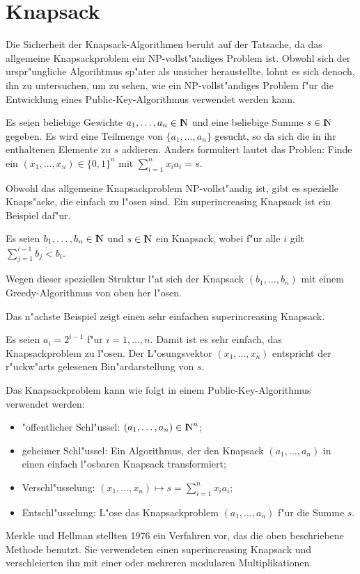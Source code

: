   \section{Knapsack}
     Die Sicherheit der Knapsack-Algorithmen beruht auf der Tatsache, 
     da\3 das allgemeine Knapsackproblem ein NP-vollst"andiges Problem ist. 
     Obwohl sich der urspr"ungliche Algorihtmus sp"ater als unsicher 
     heraustellte, lohnt es sich denoch, ihn zu untersuchen, um zu sehen, 
     wie ein NP-vollst"andiges Problem f"ur die Entwicklung eines 
     Public-Key-Algorithmus verwendet werden kann.
     \begin{definition} Es seien beliebige Gewichte 
       $a_1, \ldots ,a_n\in \N$ und eine beliebige Summe $s \in \N$ gegeben. 
       Es wird eine Teilmenge von $\{ a_1, \ldots ,a_n \}$ gesucht, so da\3 
       sich die in ihr enthaltenen Elemente zu $s$ addieren. Anders formuliert 
       lautet das Problen: Finde ein 
       $(x_1,\ldots ,x_n) \in \{0,1\}^n$ mit $\sum_{i=1}^{n}x_i a_i = s$.
     \end{definition}
     Obwohl das allgemeine Knapsackproblem NP-vollst"andig ist, gibt es 
     spezielle Knaps"acke, die einfach zu l"osen sind. Ein superincreasing 
     Knapsack ist ein Beispiel daf"ur.
     \begin{definition}
        Es seien $b_1,\ldots, b_n\in \N$ und $s\in \N$ ein Knapsack, 
        wobei f"ur alle $i$ gilt $\sum_{j=1}^{i-1}b_j < b_i$.
     \end{definition}
     Wegen dieser speziellen Struktur l"a\3t sich der Knapsack 
     $(b_1,\ldots ,b_n)$ mit einem Greedy-Algorithmus von oben her l"osen.

     Das n"achste Beispiel zeigt einen sehr einfachen superincreasing Knapsack.
     \begin{beispiel}
        Es seien $a_i = 2^{i-1}$ f"ur $i=1,\ldots , n$. Damit ist es sehr einfach,
        das Knapsackproblem zu l"osen. Der L"osungsvektor $(x_1,\ldots ,x_n)$ 
        entspricht der r"uckw"arts gelesenen Bin"ardarstellung von $s$.
     \end{beispiel}
     Das Knapsackproblem kann wie folgt in einem Public-Key-Algorithmus verwendet werden:
     \begin{itemize}
       \item "offentlicher Schl"ussel: $(a_1,\ldots,a_n) \in \N^n$;
       \item geheimer Schl"ussel: Ein Algorithmus, der den Knapsack 
             $(a_1,\ldots,a_n)$ in einen einfach l"osbaren Knapsack transformiert;
       \item Verschl"usselung: $(x_1, \ldots ,x_n ) \mapsto s=\sum_{i=1}^{n} x_i a_i$;
       \item Entschl"usselung: L"ose das Knapsackproblem $(a_1,\ldots,a_n)$ f"ur die Summe $s$.
     \end{itemize}
     Merkle und Hellman stellten 1976 ein Verfahren vor, das die oben 
     beschriebene Methode benutzt. Sie verwendeten einen superincreasing 
     Knapsack und verschleierten ihn mit einer oder mehreren modularen 
     Multiplikationen.
